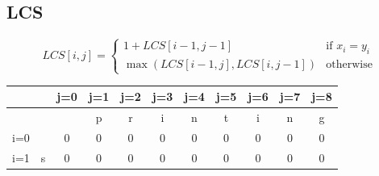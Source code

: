 \documentclass{article}
\begin{document}
\begin{multicols*}{2}
    \subsection*{LCS}
    \begin{equation*}
        LCS[i, j] = \begin{cases}
            1 + LCS[i-1, j-1]              & \text{if } x_i = y_i \\
            \max(LCS[i-1, j], LCS[i, j-1]) & \text{otherwise}
        \end{cases}
    \end{equation*}
    \hspace*{-1.5em}
    \begin{tabular}{|c|c|c|c|c|c|c|c|c|c|c|}
        \hline
                                      &                               & j=0                           & j=1                            & j=2
                                      & j=3                           & j=4                           & j=5
                                      & j=6                           & j=7                           & j=8                                                 \\
        \hline
                                      &                               &                               & p                              & r
                                      & i                             & n                             & t
                                      & i                             & n                             & g                                                   \\
        \hline
        i=0                           &                               & 0                             & 0                              & 0
                                      & 0                             & 0                             & 0
                                      & 0                             & 0                             & 0                                                   \\
        \hline
        i=1                           & s                             & 0                             & 0                              & 0
                                      & 0                             & 0                             & 0
                                      & 0                             & 0                             & 0                                                   \\
        \hline

\end{tabular}
\end{multicols*}
\end{document}
